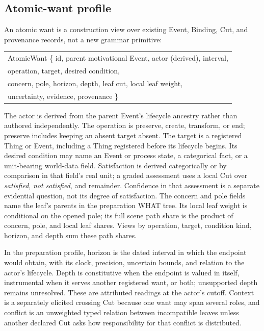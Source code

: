 \documentclass[11pt,a4paper]{article}
\begin{document}
\subsection{Atomic-want profile}
\label{app:atomic-wants}
An atomic want is a construction view over existing Event, Binding, Cut, and
provenance records, not a new grammar primitive:

\begin{center}
\small\ttfamily
\begin{tabular}{@{}l@{}}
AtomicWant \{ id, parent motivational Event, actor (derived), interval,\\
\qquad operation, target, desired condition,\\
\qquad concern, pole, horizon, depth, leaf cut, local leaf weight,\\
\qquad uncertainty, evidence, provenance \}
\end{tabular}
\end{center}

The actor is derived from the parent Event's lifecycle ancestry rather than
authored independently. The operation is preserve, create, transform, or end; preserve includes keeping
an absent target absent. The target is a registered Thing or Event, including a
Thing registered before its lifecycle begins. Its desired condition may name an
Event or process state, a categorical fact, or a unit-bearing world-data field.
Satisfaction is derived categorically or by comparison in that field's real
unit; a graded assessment uses a local Cut over \emph{satisfied},
\emph{not satisfied}, and remainder. Confidence in that assessment is a
separate evidential question, not its degree of satisfaction. The concern and
pole fields name the leaf's parents in the preparation WHAT tree. Its local leaf
weight is conditional on the opened pole; its full scene path share is the
product of concern, pole, and local leaf shares. Views by operation, target,
condition kind, horizon, and depth sum these path shares.

In the preparation profile, horizon is the dated interval in which the endpoint
would obtain, with its clock, precision, uncertain bounds, and relation to the
actor's lifecycle. Depth is constitutive when the endpoint is valued in itself,
instrumental when it serves another registered want, or both; unsupported depth
remains unresolved. These are attributed readings at the actor's cutoff.
Context is a separately
elicited crossing Cut because one want may span several roles, and conflict is
an unweighted typed relation between incompatible leaves unless another
declared Cut asks how responsibility for that conflict is distributed.
\end{document}
